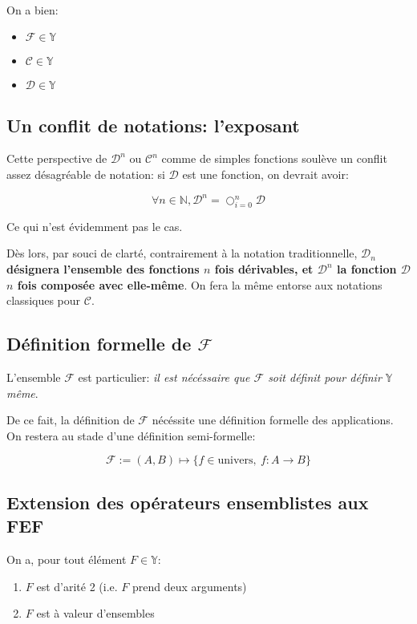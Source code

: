 \documentclass{article}
\newcommand{\Y}{{\mathbb Y}}
\newcommand{\N}{{\mathbb N}}
\newcommand{\cC}{{\mathcal C}}
\newcommand{\cD}{{\mathcal D}}
\newcommand{\cF}{{\mathcal F}}
\begin{document}
\paragraph{}
On a bien:

\begin{itemize}
	\item $\cF \in \Y$
	\item $\cC \in \Y$
	\item $\cD \in \Y$
\end{itemize}



\subsection{Un conflit de notations: l'exposant}

Cette perspective de $\cD^n$ ou $\cC^n$ comme de simples fonctions soulève un conflit assez désagréable de notation: si $\cD$ est une fonction, on devrait avoir:

\[
	\forall n \in \N, \cD^n = \bigcirc_{i=0}^n \cD
\] 

Ce qui n'est évidemment pas le cas.

Dès lors, par souci de clarté, contrairement à la notation traditionnelle, {\bf $\cD_n$ désignera l'ensemble des fonctions $n$ fois dérivables, et $\cD^n$ la fonction $\cD$ $n$ fois composée avec elle-même}. On fera la même entorse aux notations classiques pour $\cC$.

\subsection{Définition formelle de $\cF$}
\label{formal_def_F}

L'ensemble $\cF$ est particulier: \emph{il est nécéssaire que $\cF$ soit définit pour définir $\Y$ même}.

De ce fait, la définition de $\cF$ nécéssite une définition formelle des applications.
On restera au stade d'une définition semi-formelle:

\[
	\cF := (A, B) \mapsto \{ f \in \text{univers},\ f:A\to B\} 
\]

\subsection{Extension des opérateurs ensemblistes aux FEF}

On a, pour tout élément $F \in \Y$:

\begin{enumerate}
	\item $F$ est d'arité 2 (i.e. $F$ prend deux arguments)
	\item $F$ est à valeur d'ensembles
\end{enumerate}
\end{document}
